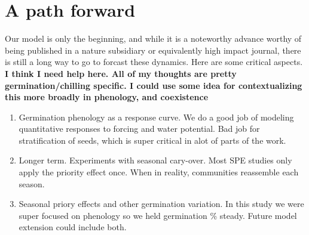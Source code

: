 \documentclass{article}[12pt]
\begin{document}
\section{A path forward}

Our model is only the beginning, and while it is a noteworthy advance worthy of being published in a nature subsidiary or equivalently high impact journal, there is still a long way to go to forcast these dynamics. Here are some critical aspects.
\textbf{I think I need help here. All of my thoughts are pretty germination/chilling specific. I could use some idea for contextualizing this more broadly in phenology, and coexistence}
\begin{enumerate}
\item Germination phenology as a response curve. We do a good job of modeling quantitative responses to forcing and water potential. Bad job for stratification of seeds, which is super critical in alot of parts of the work.
\item Longer term. Experiments with seasonal cary-over. Most SPE studies only apply the priority effect once. When in reality, communities reassemble each season.
\item Seasonal priory effects and other germination variation. In this study we were super focused on phenology so we held germination \% steady. Future model extension could include both.
\end{enumerate}






\end{document}
